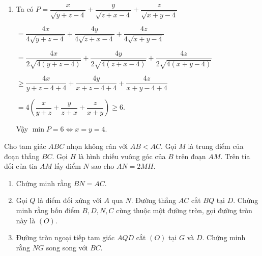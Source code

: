 \begin{ex}
{\begin{enumerate}
\item Ta có
$P=\dfrac{x}{\sqrt{y+z-4}}+\dfrac{y}{\sqrt{z+x-4}}+\dfrac{z}{\sqrt{x+y-4}}$

$=\dfrac{4x}{4\sqrt{y+z-4}}+\dfrac{4y}{4\sqrt{z+x-4}}+\dfrac{4z}{4\sqrt{x+y-4}}$

$=\dfrac{4x}{2\sqrt{4(y+z-4)}}+\dfrac{4y}{2\sqrt{4(z+x-4)}}+\dfrac{4z}{2\sqrt{4(x+y-4)}}$

$\geq \dfrac{4x}{y+z-4+4}+\dfrac{4y}{x+z-4+4}+\dfrac{4z}{x+y-4+4}$

$=4\left(\dfrac{x}{y+z}+\dfrac{y}{z+x}+\dfrac{z}{x+y}\right) \geq 6.$

Vậy $\min P=6 \Leftrightarrow x=y=4.$
    \end{enumerate}
    }
\end{ex}

\begin{ex}%

   Cho tam giác $ABC$ nhọn không cân với $AB<AC$. Gọi $M$ là trung điểm của đoạn thẳng $BC$. Gọi $H$ là hình chiếu vuông góc của $B$ trên đoạn $AM$. Trên tia đối của tia $AM$ lấy điểm $N$ sao cho $AN=2MH$.
    \begin{enumerate}
        \item Chứng minh rằng $BN=AC$.
        \item Gọi $Q$ là điểm đối xứng với $A$ qua $N$. Đường thẳng $AC$ cắt $BQ$ tại $D$. Chứng minh rằng bốn điểm $B, D, N, C$ cùng thuộc một đường tròn, gọi đường tròn này là $(O)$.
        \item Đường tròn ngoại tiếp tam giác $AQD$ cắt $(O)$ tại $G$ và $D$. Chứng minh rằng $NG$ song song với $BC$.
    \end{enumerate}
\loigiai
    { }
\end{ex}
